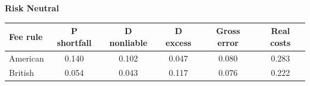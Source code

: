 \documentclass[10pt,border=5pt,varwidth=17cm]{standalone}
\begin{document}
\begingroup
\small
\setlength{\tabcolsep}{5pt}
\renewcommand{\arraystretch}{1.20}
\noindent\textbf{Risk Neutral}\par\smallskip
\noindent\begin{tabularx}{\linewidth}{@{}>{\raggedright\arraybackslash}Xccccc@{}}
\toprule
\textbf{Fee rule} & \textbf{P shortfall} & \textbf{D nonliable} & \textbf{D excess} & \textbf{Gross error} & \textbf{Real costs} \\
\midrule
American & 0.140 & 0.102 & 0.047 & 0.080 & 0.283 \\
British & 0.054 & 0.043 & 0.117 & 0.076 & 0.222 \\
\bottomrule\end{tabularx}\par\medskip
\endgroup
\end{document}
